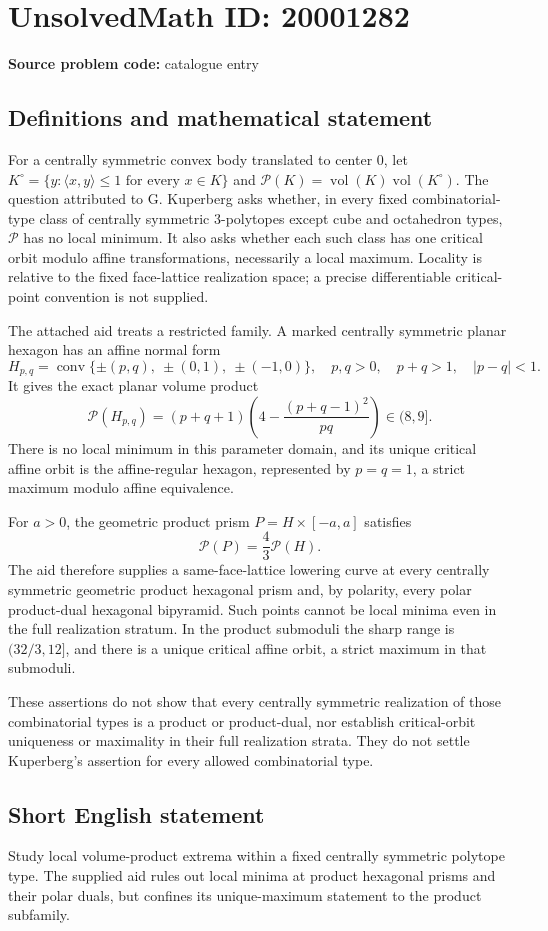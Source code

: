 \documentclass[11pt]{article}
\begin{document}
\section*{UnsolvedMath ID: 20001282}
\textbf{Source problem code:} catalogue entry
\subsection{Definitions and mathematical statement}
For a centrally symmetric convex body translated to center $0$, let $K^\circ=\{y:\langle x,y\rangle\le1\text{ for every }x\in K\}$ and $\mathcal P(K)=\operatorname{vol}(K)\operatorname{vol}(K^\circ)$. The question attributed to G. Kuperberg asks whether, in every fixed combinatorial-type class of centrally symmetric $3$-polytopes except cube and octahedron types, $\mathcal P$ has no local minimum. It also asks whether each such class has one critical orbit modulo affine transformations, necessarily a local maximum. Locality is relative to the fixed face-lattice realization space; a precise differentiable critical-point convention is not supplied.

The attached aid treats a restricted family. A marked centrally symmetric planar hexagon has an affine normal form
\[
H_{p,q}=\operatorname{conv}\{\pm(p,q),\ \pm(0,1),\ \pm(-1,0)\},
\quad p,q>0,\quad p+q>1,\quad|p-q|<1.
\]
It gives the exact planar volume product
\[
\mathcal P(H_{p,q})=(p+q+1)\left(4-\frac{(p+q-1)^2}{pq}\right)\in(8,9].
\]
There is no local minimum in this parameter domain, and its unique critical affine orbit is the affine-regular hexagon, represented by $p=q=1$, a strict maximum modulo affine equivalence.

For $a>0$, the geometric product prism $P=H\times[-a,a]$ satisfies
\[
\mathcal P(P)=\frac43\mathcal P(H).
\]
The aid therefore supplies a same-face-lattice lowering curve at every centrally symmetric geometric product hexagonal prism and, by polarity, every polar product-dual hexagonal bipyramid. Such points cannot be local minima even in the full realization stratum. In the product submoduli the sharp range is $(32/3,12]$, and there is a unique critical affine orbit, a strict maximum in that submoduli.

These assertions do not show that every centrally symmetric realization of those combinatorial types is a product or product-dual, nor establish critical-orbit uniqueness or maximality in their full realization strata. They do not settle Kuperberg's assertion for every allowed combinatorial type.
\subsection{Short English statement}
Study local volume-product extrema within a fixed centrally symmetric polytope type. The supplied aid rules out local minima at product hexagonal prisms and their polar duals, but confines its unique-maximum statement to the product subfamily.
\end{document}
